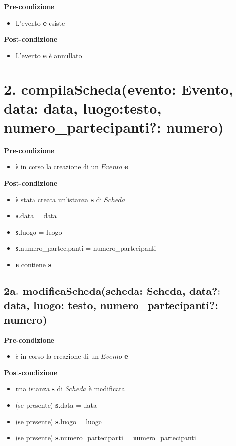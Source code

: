 \documentclass[14pt]{extarticle}
\begin{document}
\textbf{Pre-condizione}
\begin{itemize}
  \item L'evento \textbf{e} esiste
\end{itemize}
\textbf{Post-condizione}
\begin{itemize}
  \item L'evento \textbf{e} è annullato
\end{itemize}


\section*{2. compilaScheda(evento: Evento, data: data, luogo:testo, numero\_partecipanti?: numero)}

\textbf{Pre-condizione}
\begin{itemize}
  \item è in corso la creazione di un $Evento$ \textbf{e}
\end{itemize} 
\textbf{Post-condizione} 
\begin{itemize}
  \item è stata creata un'istanza \textbf{s} di $Scheda$
  \item \textbf{s}.data = data
  \item \textbf{s}.luogo = luogo
  \item \textbf{s}.numero\_partecipanti = numero\_partecipanti
  \item \textbf{e} contiene \textbf{s}
\end{itemize}

\subsection*{2a. modificaScheda(scheda: Scheda, data?: data, luogo: testo, numero\_partecipanti?: numero)}

\textbf{Pre-condizione}
\begin{itemize}
  \item è in corso la creazione di un $Evento$ \textbf{e}
\end{itemize} 
\textbf{Post-condizione}
\begin{itemize}
  \item una istanza \textbf{s} di $Scheda$ è modificata
  \item (se presente) \textbf{s}.data = data
  \item (se presente) \textbf{s}.luogo = luogo
  \item (se presente) \textbf{s}.numero\_partecipanti = numero\_partecipanti
\end{itemize} 
\end{document}
